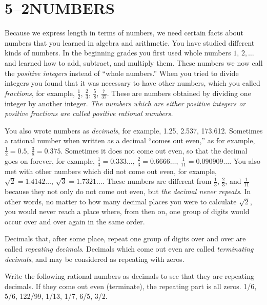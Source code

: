 \documentclass[11pt]{book}
\begin{document}
\section*{5--2\quad NUMBERS}

Because we express length in terms of numbers, we need certain facts about
numbers that you learned in algebra and arithmetic. You have studied different
kinds of numbers. In the beginning grades you first used whole numbers
$1$, $2,\ldots$ and learned how to add, subtract, and multiply them. These
numbers we now call the \emph{positive integers} instead of ``whole numbers.''
When you tried to divide integers you found that it was necessary to have other
numbers, which you called \emph{fractions}, for example,
$\frac{1}{2}$, $\frac{2}{3}$, $\frac{5}{8}$, $\frac{7}{37}$. These are numbers
obtained by dividing one integer by another integer. \emph{The numbers which
are either positive integers or positive fractions are called positive rational
numbers.}

You also wrote numbers as \emph{decimals}, for example, 1.25, 2.537, 173.612.
Sometimes a rational number when written as a decimal ``comes out even,'' as
for example, $\frac{1}{2} = 0.5$, $\frac{3}{8} = 0.375$. Sometimes it does not
come out even, so that the decimal goes on forever, for example,
$\frac{1}{3} = 0.333\ldots$, $\frac{2}{3} = 0.6666\ldots$,
$\frac{1}{11} = 0.090909\ldots$. You also met with other numbers which did not
come out even, for example, $\sqrt{2} = 1.4142\ldots$,
$\sqrt{3} = 1.7321\ldots$. These numbers are different from $\frac{1}{3}$,
$\frac{2}{3}$, and $\frac{1}{11}$ because they not only do not come out even,
but \emph{the decimal never repeats}. In other words, no matter to how many
decimal places you were to calculate $\sqrt{2}$, you would never reach a place
where, from then on, one group of digits would occur over and over again in the
same order.

Decimals that, after some place, repeat one group of digits over and over are
called \emph{repeating decimals}. Decimals which come out even are called
\emph{terminating decimals}, and may be considered as repeating with zeros.


Write the following rational numbers as decimals to see that they are repeating
decimals. If they come out even (terminate), the repeating part is all zeros.
1/6, 5/6, 122/99, 1/13, 1/7, 6/5, 3/2.
\end{document}
